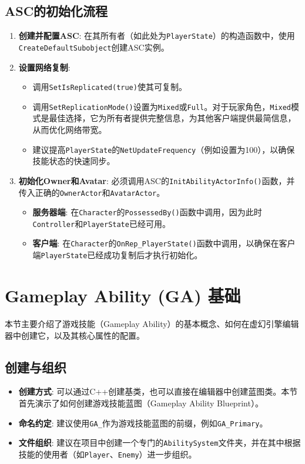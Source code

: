 \documentclass[10pt,CJKmath]{zhbook-v1}
\begin{document}
\subsection{ASC的初始化流程}
\begin{enumerate}
    \item \textbf{创建并配置ASC}: 在其所有者（如此处为\texttt{PlayerState}）的构造函数中，使用\texttt{CreateDefaultSubobject}创建ASC实例。
    \item \textbf{设置网络复制}:
    \begin{itemize}
        \item 调用\texttt{SetIsReplicated(true)}使其可复制。
        \item 调用\texttt{SetReplicationMode()}设置为\texttt{Mixed}或\texttt{Full}。对于玩家角色，\texttt{Mixed}模式是最佳选择，它为所有者提供完整信息，为其他客户端提供最简信息，从而优化网络带宽。
        \item 建议提高\texttt{PlayerState}的\texttt{NetUpdateFrequency}（例如设置为100），以确保技能状态的快速同步。
    \end{itemize}
    \item \textbf{初始化Owner和Avatar}: 必须调用ASC的\texttt{InitAbilityActorInfo()}函数，并传入正确的\texttt{OwnerActor}和\texttt{AvatarActor}。
    \begin{itemize}
        \item \textbf{服务器端}: 在\texttt{Character}的\texttt{PossessedBy()}函数中调用，因为此时\texttt{Controller}和\texttt{PlayerState}已经可用。
        \item \textbf{客户端}: 在\texttt{Character}的\texttt{OnRep\_PlayerState()}函数中调用，以确保在客户端\texttt{PlayerState}已经成功复制后才执行初始化。
    \end{itemize}
\end{enumerate}


\section{Gameplay Ability (GA) 基础}
本节主要介绍了游戏技能（Gameplay Ability）的基本概念、如何在虚幻引擎编辑器中创建它，以及其核心属性的配置。

\subsection{创建与组织}
\begin{itemize}
    \item \textbf{创建方式}: 可以通过C++创建基类，也可以直接在编辑器中创建蓝图类。本节首先演示了如何创建游戏技能蓝图（Gameplay Ability Blueprint）。
    \item \textbf{命名约定}: 建议使用\texttt{GA\_}作为游戏技能蓝图的前缀，例如\texttt{GA\_Primary}。
    \item \textbf{文件组织}: 建议在项目中创建一个专门的\texttt{AbilitySystem}文件夹，并在其中根据技能的使用者（如\texttt{Player}、\texttt{Enemy}）进一步组织。
\end{itemize}
\end{document}

